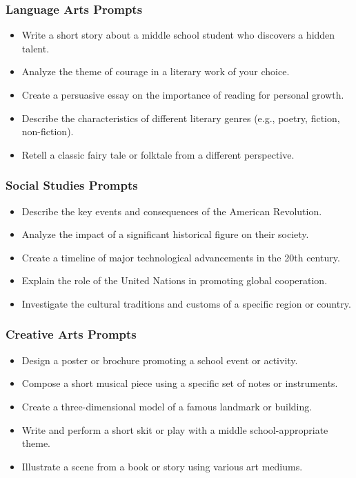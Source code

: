 \begin{frame}[fragile]\frametitle{Language Arts Prompts}
    \begin{itemize}
        \item Write a short story about a middle school student who discovers a hidden talent.
        \item Analyze the theme of courage in a literary work of your choice.
        \item Create a persuasive essay on the importance of reading for personal growth.
        \item Describe the characteristics of different literary genres (e.g., poetry, fiction, non-fiction).
        \item Retell a classic fairy tale or folktale from a different perspective.
    \end{itemize}
\end{frame}

\begin{frame}[fragile]\frametitle{Social Studies Prompts}
    \begin{itemize}
        \item Describe the key events and consequences of the American Revolution.
        \item Analyze the impact of a significant historical figure on their society.
        \item Create a timeline of major technological advancements in the 20th century.
        \item Explain the role of the United Nations in promoting global cooperation.
        \item Investigate the cultural traditions and customs of a specific region or country.
    \end{itemize}
\end{frame}

\begin{frame}[fragile]\frametitle{Creative Arts Prompts}
    \begin{itemize}
        \item Design a poster or brochure promoting a school event or activity.
        \item Compose a short musical piece using a specific set of notes or instruments.
        \item Create a three-dimensional model of a famous landmark or building.
        \item Write and perform a short skit or play with a middle school-appropriate theme.
        \item Illustrate a scene from a book or story using various art mediums.
    \end{itemize}
\end{frame}

